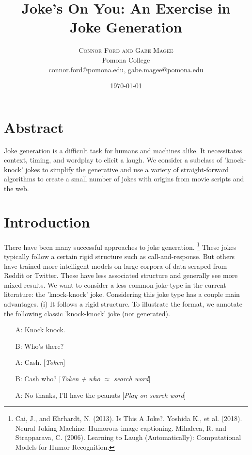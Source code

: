 \documentclass[twoside,twocolumn]{article}
\title{Joke's On You: An Exercise in Joke Generation}
\author{%
\textsc{Connor Ford and Gabe Magee} \\[1ex] 
\normalsize Pomona College \\ 
\normalsize connor.ford@pomona.edu, gabe.magee@pomona.edu
}
\date{\today}
\begin{document}
\maketitle

\section*{Abstract}

Joke generation is a difficult task for humans and machines alike. It necessitates context, timing, and wordplay to elicit a laugh. We consider a subclass of 'knock-knock' jokes to simplify the generative and use a variety of straight-forward algorithms to create a small number of jokes with origins from movie scripts and the web.

\section{Introduction}

There have been many successful approaches to joke generation. \footnote{Cai, J., and Ehrhardt, N. (2013). Is This A Joke?. Yoshida K., et al. (2018). Neural Joking Machine: Humorous image captioning. Mihalcea, R. and Strapparava, C. (2006). Learning to Laugh (Automatically): Computational Models for Humor Recognition.} 
These jokes typically follow a certain rigid structure such as call-and-response. But others have trained more intelligent models on large corpora of data scraped from Reddit or Twitter. These have less associated structure and generally see more mixed results.
We want to consider a less common joke-type in the current literature: the 'knock-knock' joke. Considering this joke type has a couple main advantages.
(i) It follows a rigid structure. To illustrate the format, we annotate the following classic 'knock-knock' joke (not generated).
\begin{center}
\begin{enumerate}
\item[A:] Knock knock.
\item[B:] Who's there?
\item[A:] Cash. [\emph{Token}]
\item[B:] Cash who? [\emph{Token + who $\approx$ search word}]
\item[A:] No thanks, I'll have the peanuts [\emph{Play on search word}]
\end{enumerate}
\end{center}
\end{document}

